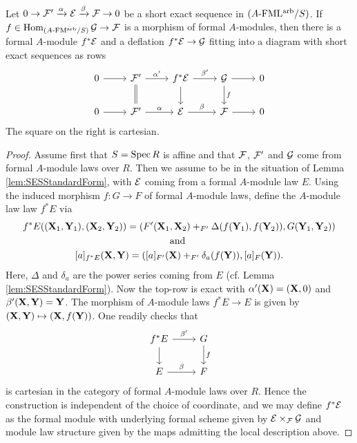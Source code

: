 \documentclass[../main.tex]{subfiles}
\begin{document}
\begin{lem}
  Let $0 \to \mathcal{F}' \xrightarrow{\alpha} \mathcal{E} \xrightarrow{\beta} \mathcal{F} \to 0$ be a short exact sequence in 
  ${({A}\textnormal-\allowbreak\mathrm{FML^{arb}}/{S})}$. If $f \in \operatorname{Hom}_{{({A}\textnormal-\allowbreak\mathrm{FM^{arb}}/{S})}} \mathcal{G} \to \mathcal{F}$ is a morphism 
  of formal $A$-modules, then there is a formal $A$-module $f^*\mathcal{E}$ 
  and a deflation $f^*\mathcal{E} \to \mathcal{G}$ fitting into a diagram with short exact 
  sequences as rows
  \begin{equation*}
    \begin{tikzcd}[ampersand replacement=\&]
	    0 \& {\cF'} \& {f^*\cE} \& \cG \& 0 \\
	    0 \& {\cF'} \& \cE \& \cF \& 0
	    \arrow[from=1-1, to=1-2]
	    \arrow["{\alpha'}", from=1-2, to=1-3]
	    \arrow[Rightarrow, no head, from=1-2, to=2-2]
	    \arrow["{\beta'}", from=1-3, to=1-4]
	    \arrow[from=1-3, to=2-3]
	    \arrow[from=1-4, to=1-5]
	    \arrow["f", from=1-4, to=2-4]
	    \arrow[from=2-1, to=2-2]
	    \arrow["\alpha", from=2-2, to=2-3]
	    \arrow["\beta", from=2-3, to=2-4]
	    \arrow[from=2-4, to=2-5]
    \end{tikzcd}
  \end{equation*}
  The square on the right is cartesian.
\begin{proof}
  Assume first that $S = \operatorname{Spec} R$ is affine and that $\mathcal{F}$, $\mathcal{F}'$ and $\mathcal{G}$ 
  come from formal $A$-module laws over $R$. Then we assume to be in the
  situation of Lemma \ref{lem:SESStandardForm}, with
  $\mathcal{E}$ coming from a formal $A$-module law $E$. Using the induced morphism 
  $f: G \to F$ of formal $A$-module laws, define the $A$-module law
  law $f^* E$ via
  \begin{gather*}
    f^*E((\mathbf{X}_1, \mathbf{Y}_1), (\mathbf{X}_2, \mathbf{Y}_2)) = (F'(\mathbf{X}_1, \mathbf{X}_2) +_{F'}
    \Delta(f(\mathbf{Y}_1), f(\mathbf{Y}_2)) , G(\mathbf{Y}_1, \mathbf{Y}_2)) \\
    \text{and } \\
    [a]_{f^*E}(\mathbf{X}, \mathbf{Y}) = ([a]_{F'}(\mathbf{X}) +_{F'} \delta_a(f(\mathbf{Y})), [a]_F(\mathbf{Y})).
  \end{gather*}
  Here, $\Delta$ and $\delta_a$ are the power series coming from $E$ (cf.
  Lemma \ref{lem:SESStandardForm}).
  Now the top-row is exact with $\alpha'(\mathbf{X}) = (\mathbf{X}, 0)$ and 
  $\beta'(\mathbf{X}, \mathbf{Y}) = \mathbf{Y}$. 
  The morphism of $A$-module laws $f^*E \to E$ is given by 
  $(\mathbf{X}, \mathbf{Y})\mapsto (\mathbf{X},f(\mathbf{Y}))$. One readily checks that 
  \begin{equation*}
    \begin{tikzcd}[ampersand replacement=\&]
    	{f^*E} \& G \\
    	E \& F
    	\arrow["{\beta'}", from=1-1, to=1-2]
    	\arrow[from=1-1, to=2-1]
    	\arrow["f", from=1-2, to=2-2]
    	\arrow["\beta", from=2-1, to=2-2]
    \end{tikzcd}
  \end{equation*}
  is cartesian in the category of formal $A$-module laws over $R$. 
  Hence the construction is independent of the choice of coordinate,
  and we may define $f^* \mathcal{E}$ as the formal module with underlying formal
  scheme given by $\mathcal{E} \times_{\mathcal{F}} \mathcal{G}$ and module law structure given by the
  maps admitting the local description above.
  \end{proof}
\end{lem}
\end{document}
